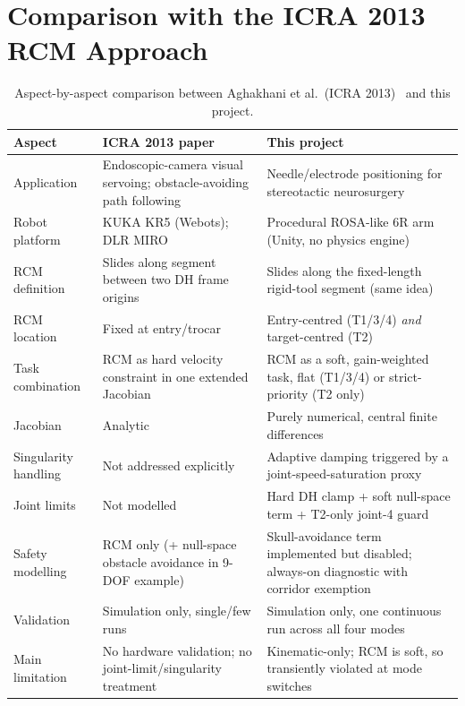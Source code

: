 \documentclass[11pt,a4paper]{article}
\begin{document}
\section{Comparison with the ICRA 2013 RCM Approach}
\label{sec:comparison}

\begin{table}[H]
\centering
\footnotesize
\caption{Aspect-by-aspect comparison between Aghakhani et al.\ (ICRA 2013)~\cite{aghakhani2013} and this project.}
\label{tab:comparison}
\begin{tabularx}{\textwidth}{l X X}
\toprule
Aspect & ICRA 2013 paper & This project \\
\midrule
Application & Endoscopic-camera visual servoing; obstacle-avoiding path following & Needle/electrode positioning for stereotactic neurosurgery \\
Robot platform & KUKA KR5 (Webots); DLR MIRO & Procedural ROSA-like 6R arm (Unity, no physics engine) \\
RCM definition & Slides along segment between two DH frame origins & Slides along the fixed-length rigid-tool segment (same idea) \\
RCM location & Fixed at entry/trocar & Entry-centred (T1/3/4) \emph{and} target-centred (T2) \\
Task combination & RCM as hard velocity constraint in one extended Jacobian & RCM as a soft, gain-weighted task, flat (T1/3/4) or strict-priority (T2 only) \\
Jacobian & Analytic & Purely numerical, central finite differences \\
Singularity handling & Not addressed explicitly & Adaptive damping triggered by a joint-speed-saturation proxy \\
Joint limits & Not modelled & Hard DH clamp + soft null-space term + T2-only joint-4 guard \\
Safety modelling & RCM only (+ null-space obstacle avoidance in 9-DOF example) & Skull-avoidance term implemented but disabled; always-on diagnostic with corridor exemption \\
Validation & Simulation only, single/few runs & Simulation only, one continuous run across all four modes \\
Main limitation & No hardware validation; no joint-limit/singularity treatment & Kinematic-only; RCM is soft, so transiently violated at mode switches \\
\bottomrule
\end{tabularx}
\end{table}
\end{document}

